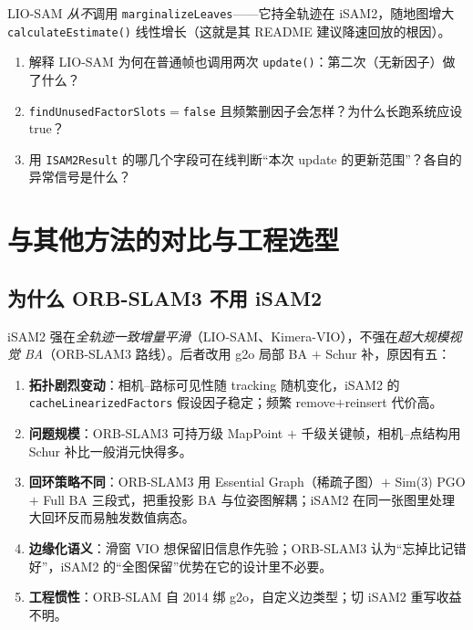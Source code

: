 \noindent LIO-SAM \emph{从不}调用 \texttt{marginalizeLeaves}——它持全轨迹在 iSAM2，随地图增大 \texttt{calculateEstimate()} 线性增长（这就是其 README 建议降速回放的根因）。

\begin{practice}
\begin{enumerate}
  \item 解释 LIO-SAM 为何在普通帧也调用两次 \texttt{update()}：第二次（无新因子）做了什么？
  \item \texttt{findUnusedFactorSlots}$=$\texttt{false} 且频繁删因子会怎样？为什么长跑系统应设 true？
  \item 用 \texttt{ISAM2Result} 的哪几个字段可在线判断“本次 update 的更新范围”？各自的异常信号是什么？
\end{enumerate}
\end{practice}

\section{与其他方法的对比与工程选型}
\label{sec:isam-compare}

\subsection{为什么 ORB-SLAM3 不用 iSAM2}
\label{sec:isam-orbslam}

iSAM2 强在\emph{全轨迹一致增量平滑}（LIO-SAM、Kimera-VIO），不强在\emph{超大规模视觉 BA}（ORB-SLAM3 路线）。后者改用 g2o 局部 BA $+$ Schur 补，原因有五：
\begin{enumerate}
  \item \textbf{拓扑剧烈变动}：相机--路标可见性随 tracking 随机变化，iSAM2 的 \texttt{cacheLinearizedFactors} 假设因子稳定；频繁 remove$+$reinsert 代价高。
  \item \textbf{问题规模}：ORB-SLAM3 可持万级 MapPoint $+$ 千级关键帧，相机--点结构用 Schur 补比一般消元快得多。
  \item \textbf{回环策略不同}：ORB-SLAM3 用 Essential Graph（稀疏子图）$+$ Sim(3) PGO $+$ Full BA 三段式，把重投影 BA 与位姿图解耦；iSAM2 在同一张图里处理大回环反而易触发数值病态。
  \item \textbf{边缘化语义}：滑窗 VIO 想保留旧信息作先验；ORB-SLAM3 认为“忘掉比记错好”，iSAM2 的“全图保留”优势在它的设计里不必要。
  \item \textbf{工程惯性}：ORB-SLAM 自 2014 绑 g2o，自定义边类型；切 iSAM2 重写收益不明。
\end{enumerate}

